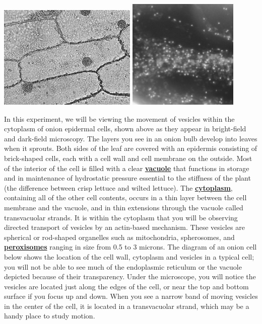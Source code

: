\documentclass{../lab}
\begin{document}
\noindent
\href{http://experimentationlab.berkeley.edu/sites/default/files/images/250px-Image005.png}{\includegraphics[width=0.33\linewidth,keepaspectratio]{images/250px-Image005.png}}
\href{http://experimentationlab.berkeley.edu/sites/default/files/images/Image003.png}{\includegraphics[width=0.33\linewidth,keepaspectratio]{images/Image003.png}}

In this experiment, we will be viewing the movement of vesicles within the cytoplasm of onion epidermal cells, shown above as they appear in bright-field and dark-field microscopy. The layers you see in an onion bulb develop into leaves when it sprouts. Both sides of the leaf are covered with an epidermis consisting of brick-shaped cells, each with a cell wall and cell membrane on the outside. Most of the interior of the cell is filled with a clear \href{http://en.wikipedia.org/wiki/Vacuole}{\textbf{vacuole}} that functions in storage and in maintenance of hydrostatic pressure essential to the stiffness of the plant (the difference between crisp lettuce and wilted lettuce). The \href{http://en.wikipedia.org/wiki/Cytoplasm}{\textbf{cytoplasm}}, containing all of the other cell contents, occurs in a thin layer between the cell membrane and the vacuole, and in thin extensions through the vacuole called transvacuolar strands. It is within the cytoplasm that you will be observing directed transport of vesicles by an actin-based mechanism. These vesicles are spherical or rod-shaped organelles such as mitochondria, spherosomes, and \href{http://en.wikipedia.org/wiki/Peroxisome}{\textbf{peroxisomes}} ranging in size from 0.5 to 3 microns. The diagram of an onion cell below shows the location of the cell wall, cytoplasm and vesicles in a typical cell; you will not be able to see much of the endoplasmic reticulum or the vacuole depicted because of their transparency. Under the microscope, you will notice the vesicles are located just along the edges of the cell, or near the top and bottom surface if you focus up and down. When you see a narrow band of moving vesicles in the center of the cell, it is located in a transvacuolar strand, which may be a handy place to study motion.
\end{document}
